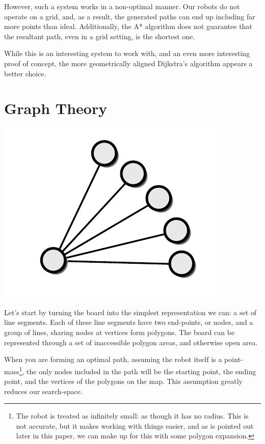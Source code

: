 \documentclass[letterpaper, 12pt]{article}
\begin{document}
\begin{multicols}{2}
However, such a system works in a non-optimal manner. Our robots do not operate
on a grid, and, as a result, the generated paths can end up including far more
points than ideal. Additionally, the A* algorithm does not guarantee that the
resultant path, even in a grid setting, is the shortest one.

While this is an interesting system to work with, and an even more interesting
proof of concept, the more geometrically aligned Dijkstra's algorithm appears a
better choice.

\section{Graph Theory}

\includegraphics[width=\columnwidth]{img/graph_theory.pdf}

Let's start by turning the board into the simplest representation we can: a set
of line segments. Each of these line segments have two end-points, or nodes, and
a group of lines, sharing nodes at vertices form polygons. The board can be
represented through a set of inaccessible polygon areas, and otherwise open
area.

When you are forming an optimal path, assuming the robot itself is a
point-mass\footnote{The robot is treated as infinitely small: as though it has
no radius. This is not accurate, but it makes working with things easier, and as
is pointed out later in this paper, we can make up for this with some polygon
expansion.}, the only nodes included in the path will be the starting point, the
ending point, and the vertices of the polygons on the map. This assumption
greatly reduces our search-space.


\end{multicols}
\end{document}
